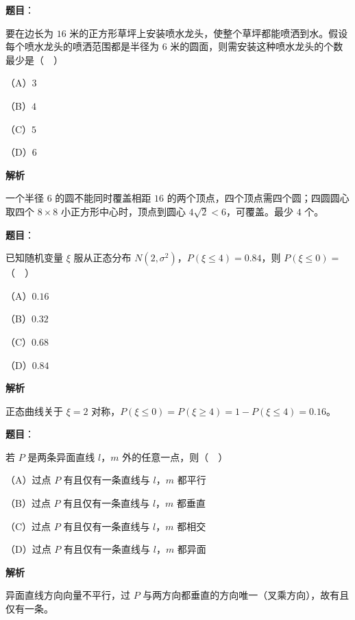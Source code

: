 \begin{answer}

\textbf{题目}：

要在边长为 $16$ 米的正方形草坪上安装喷水龙头，使整个草坪都能喷洒到水。假设每个喷水龙头的喷洒范围都是半径为 $6$ 米的圆面，则需安装这种喷水龙头的个数最少是（　）
\nopagebreak[4]
\begin{center}\end{center}
\nopagebreak[4]
（A）$3$

（B）$4$

（C）$5$

（D）$6$

\textbf{解析}

一个半径 $6$ 的圆不能同时覆盖相距 $16$ 的两个顶点，四个顶点需四个圆；四圆圆心取四个 $8\times8$ 小正方形中心时，顶点到圆心 $4\sqrt2<6$，可覆盖。最少 $4$ 个。


\end{answer}
\begin{answer}

\textbf{题目}：

已知随机变量 $\xi$ 服从正态分布 $N(2,\sigma^2)$，$P(\xi\leqslant4)=0.84$，则 $P(\xi\leqslant0)=$（　）

（A）$0.16$

（B）$0.32$

（C）$0.68$

（D）$0.84$

\textbf{解析}

正态曲线关于 $\xi=2$ 对称，$P(\xi\leqslant0)=P(\xi\geqslant4)=1-P(\xi\leqslant4)=0.16$。


\end{answer}
\begin{answer}

\textbf{题目}：

若 $P$ 是两条异面直线 $l$，$m$ 外的任意一点，则（　）

（A）过点 $P$ 有且仅有一条直线与 $l$，$m$ 都平行

（B）过点 $P$ 有且仅有一条直线与 $l$，$m$ 都垂直

（C）过点 $P$ 有且仅有一条直线与 $l$，$m$ 都相交

（D）过点 $P$ 有且仅有一条直线与 $l$，$m$ 都异面

\textbf{解析}

异面直线方向向量不平行，过 $P$ 与两方向都垂直的方向唯一（叉乘方向），故有且仅有一条。


\end{answer}
